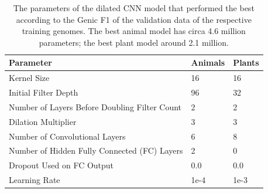 \documentclass{article}
\begin{document}
\begin{table}[!h]
\renewcommand\thetable{S1}
\centering
\begin{tabular}{@{}lll@{}}
\hline
Parameter & Animals & Plants\\ [0.5ex]
\hline
Kernel Size & 16 & 16\\
Initial Filter Depth & 96 & 32\\
Number of Layers Before Doubling Filter Count & 2 & 2\\
Dilation Multiplier & 3 & 3\\
Number of Convolutional Layers & 6 & 8\\
Number of Hidden Fully Connected (FC) Layers & 2 & 0\\
Dropout Used on FC Output & 0.0 & 0.0\\
Learning Rate & 1e-4 & 1e-3\\
\hline
\end{tabular}
\caption{The parameters of the dilated CNN model that performed the best according to the Genic F1 of the validation data of the respective training genomes. The best animal model has circa 4.6 million parameters; the best plant model around 2.1 million.}
\end{table}



\renewcommand\refname{Supplemental References}


\end{document}
